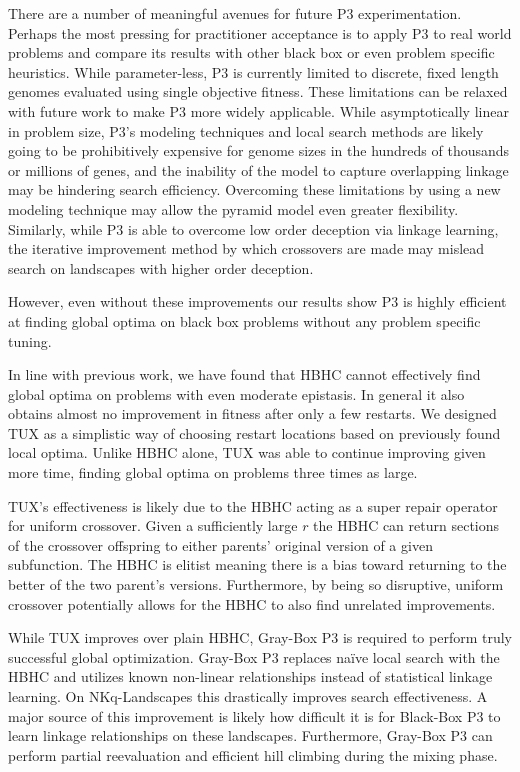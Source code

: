 There are a number of meaningful avenues for future P3 experimentation. Perhaps the most
pressing for practitioner acceptance is to apply P3 to real world problems and compare
its results with other black box or even problem specific heuristics. While parameter-less,
P3 is currently limited to discrete, fixed length genomes evaluated using single objective
fitness. These limitations can be relaxed with future work to make P3 more widely applicable.
While asymptotically linear in problem size, P3's modeling techniques and local search methods are likely going
to be prohibitively expensive for genome sizes in the hundreds of thousands or millions of genes,
and the inability of the model to capture overlapping linkage may be hindering
search efficiency. Overcoming these limitations by using a new modeling technique may allow
the pyramid model even greater flexibility. Similarly, while P3 is able to overcome low
order deception via linkage learning, the iterative improvement method by which crossovers
are made may mislead search on landscapes with higher order deception.

However, even without
these improvements our results show P3 is highly efficient at finding
global optima on black box problems without any problem specific tuning.

In line with previous work, we have found that HBHC cannot effectively find global optima
on problems with even moderate epistasis. In general it also obtains almost no improvement
in fitness after only a few restarts. We designed TUX as a simplistic way of choosing
restart locations based on previously found local optima. Unlike HBHC alone, TUX
was able to continue improving given more time, finding global optima on problems three
times as large.

TUX's effectiveness is likely due to the HBHC acting as a super repair operator for uniform crossover.
Given a sufficiently large $r$ the HBHC can return sections of the crossover offspring to either
parents' original version of a given subfunction. The HBHC is elitist meaning there is a bias toward
returning to the better of the two parent's versions. Furthermore, by being so disruptive,
uniform crossover potentially allows for the HBHC to also find unrelated improvements.

While TUX improves over plain HBHC, Gray-Box P3 is required to perform truly successful
global optimization. Gray-Box P3 replaces na\"{i}ve local search with the HBHC and utilizes
known non-linear relationships instead of statistical linkage learning. On NKq-Landscapes this drastically
improves search effectiveness. A major source of this improvement is likely how difficult it is
for Black-Box P3 to learn linkage relationships on these landscapes. Furthermore, Gray-Box P3
can perform partial reevaluation and efficient hill climbing during the mixing phase.

